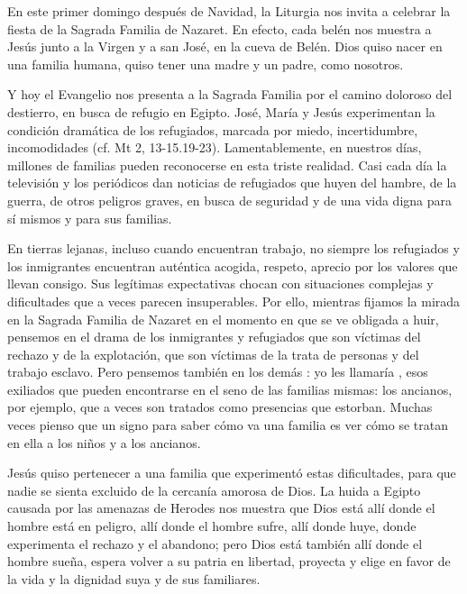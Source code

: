 				\begin{body}
					En este primer domingo después de Navidad, la Liturgia nos invita a celebrar la fiesta de la Sagrada Familia de Nazaret. En efecto, cada belén nos muestra a Jesús junto a la Virgen y a san José, en la cueva de Belén. Dios quiso nacer en una familia humana, quiso tener una madre y un padre, como nosotros.
					
					Y hoy el Evangelio nos presenta a la Sagrada Familia por el camino doloroso del destierro, en busca de refugio en Egipto. José, María y Jesús experimentan la condición dramática de los refugiados, marcada por miedo, incertidumbre, incomodidades (cf. Mt 2, 13-15.19-23). Lamentablemente, en nuestros días, millones de familias pueden reconocerse en esta triste realidad. Casi cada día la televisión y los periódicos dan noticias de refugiados que huyen del hambre, de la guerra, de otros peligros graves, en busca de seguridad y de una vida digna para sí mismos y para sus familias.
					
					En tierras lejanas, incluso cuando encuentran trabajo, no siempre los refugiados y los inmigrantes encuentran auténtica acogida, respeto, aprecio por los valores que llevan consigo. Sus legítimas expectativas chocan con situaciones complejas y dificultades que a veces parecen insuperables. Por ello, mientras fijamos la mirada en la Sagrada Familia de Nazaret en el momento en que se ve obligada a huir, pensemos en el drama de los inmigrantes y refugiados que son víctimas del rechazo y de la explotación, que son víctimas de la trata de personas y del trabajo esclavo. Pero pensemos también en los demás : yo les llamaría , esos exiliados que pueden encontrarse en el seno de las familias mismas: los ancianos, por ejemplo, que a veces son tratados como presencias que estorban. Muchas veces pienso que un signo para saber cómo va una familia es ver cómo se tratan en ella a los niños y a los ancianos.
					
					Jesús quiso pertenecer a una familia que experimentó estas dificultades, para que nadie se sienta excluido de la cercanía amorosa de Dios. La huida a Egipto causada por las amenazas de Herodes nos muestra que Dios está allí donde el hombre está en peligro, allí donde el hombre sufre, allí donde huye, donde experimenta el rechazo y el abandono; pero Dios está también allí donde el hombre sueña, espera volver a su patria en libertad, proyecta y elige en favor de la vida y la dignidad suya y de sus familiares.
					

\end{body}
